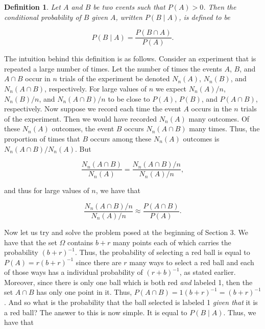 \documentclass{article}
\theoremstyle{definition}
\newtheorem{definition}{Definition}[section]
\theoremstyle{remark}
\theoremstyle{definition}
\begin{document}
\begin{definition}
    \textit{Let $A$ and $B$ be two events such that $P(A)>0$. Then the conditional probability of $B$ given $A$, written $P(B\mid A)$, is defined to be} 
    
    \begin{equation*}
        P(B\mid A)=\frac{P(B\cap A)}{P(A)}.
    \end{equation*}
\end{definition}

 The intuition behind this definition is as follows. Consider an experiment that is repeated a large number of times. Let the number of times the events $A$, $B$, and $A\cap B$ occur in $n$ trials of the experiment be denoted $N_n(A)$, $N_n(B)$, and $N_n(A\cap B)$, respectively. For large values of $n$ we expect $N_n(A)/n$, $N_n(B)/n$, and $N_n(A\cap B)/n$ to be close to $P(A)$, $P(B)$, and $P(A\cap B)$, respectively. Now suppose we record each time the event $A$ occurs in the $n$ trials of the experiment. Then we would have recorded $N_n(A)$ many outcomes. Of these $N_n(A)$ outcomes, the event $B$ occurs $N_n(A\cap B)$ many times. Thus, the proportion of times that $B$ occurs among these $N_n(A)$ outcomes is $N_n(A\cap B)/N_n(A)$. But
 
 \begin{equation*}
     \frac{N_n(A\cap B)}{N_n(A)}=\frac{N_n(A\cap B)/n}{N_n(A)/n},
 \end{equation*}
 
 \noindent and thus for large values of $n$, we have that 
 
 \begin{equation*}
     \frac{N_n(A\cap B)/n}{N_n(A)/n}\approx \frac{P(A\cap B)}{P(A)}.
 \end{equation*}
 
 Now let us try and solve the problem posed at the beginning of Section 3. We have that the set $\Omega$ contains $b+r$ many points each of which carries the probability $(b+r)^{-1}$. Thus, the probability of selecting a red ball is equal to $P(A)=r(b+r)^{-1}$ since there are $r$ many ways to select a red ball and each of those ways has a individual probability of $(r+b)^{-1}$, as stated earlier. Moreover, since there is only one ball which is both red \textit{and} labeled 1, then the set $A\cap B$ has only one point in it. Thus, $P(A\cap B)=1(b+r)^{-1}=(b+r)^{-1}$. And so what is the probability that the ball selected is labeled 1 \textit{given that} it is a red ball? The answer to this is now simple. It is equal to $P(B\mid A)$. Thus, we have that
 
\end{document}
